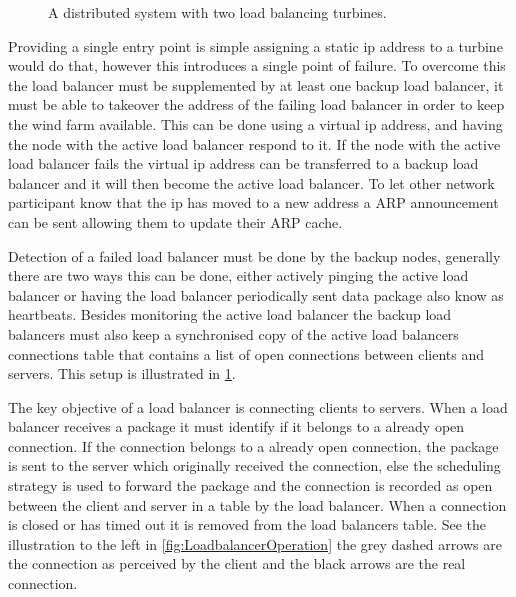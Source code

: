 \begin{figure}
	\centering	
	\scalebox{0.7}{}
	\caption[Distributed system with two load balancing turbines]{
		\label{fig:loadBalancingSetup2Balancers} 
		\footnotesize{%
			A distributed system with two load balancing turbines.
		}
	}
\end{figure}


Providing a single entry point is simple assigning a static ip address to a turbine would do that, however this introduces a single point of failure.
To overcome this the load balancer must be supplemented by at least one backup load balancer, it must be able to takeover the address of the failing load balancer in order to keep the wind farm available.
This can be done using a virtual ip address, and having the node with the active load balancer respond to it.
If the node with the active load balancer fails the virtual ip address can be transferred to a backup load balancer and it will then become the active load balancer. To let other network participant know that the ip has moved to a new address a ARP announcement can be sent allowing them to update their ARP cache.

Detection of a failed load balancer must be done by the backup nodes, generally there are two ways this can be done, either actively pinging the active load balancer or having the load balancer periodically sent data package also know as heartbeats.
Besides monitoring the active load balancer the backup load balancers must also keep a synchronised copy of the active load balancers connections table that contains a list of open connections between clients and servers.
This setup is illustrated in \cref{fig:loadBalancingSetup2Balancers}.


The key objective of a load balancer is connecting clients to servers.
When a load balancer receives a package it must identify if it belongs to a already open connection.
If the connection belongs to a already open connection, the package is sent to the server which originally received the connection, else the scheduling strategy is used to forward the package and the connection is recorded as open between the client and server in a table by the load balancer.
When a connection is closed or has timed out it is removed from the load balancers table. See the illustration to the left in \cref{fig:LoadbalancerOperation} the grey dashed arrows are the connection as perceived by the client and the black arrows are the real connection.

